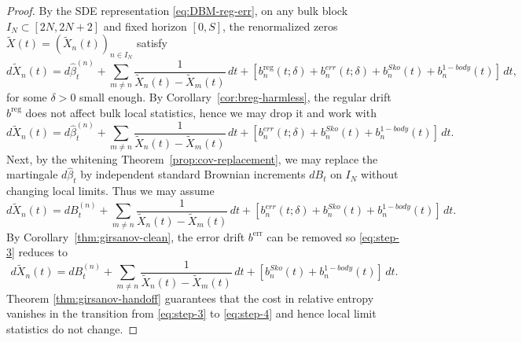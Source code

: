 \documentclass[12pt,reqno]{amsart}
\theoremstyle{plain}
\theoremstyle{definition}
\theoremstyle{remark}
\begin{document}
\begin{proof}
By the SDE representation \eqref{eq:DBM-reg-err}, on any bulk block
$I_N\subset[2N,2N+2]$ and fixed horizon $[0,S]$, the renormalized zeros
$\widetilde X(t)=(\widetilde X_n(t))_{n\in I_N}$ satisfy
\begin{equation}\label{eq:step-1}
d\widetilde X_n(t)
= d\hat\beta^{(n)}_t
+ \sum_{m \neq n}\frac{1}{\widetilde X_n(t)-\widetilde X_m(t)}\,dt
+ \left [b^{\mathrm{reg}}_n(t; \delta)+ b^{err}_n(t; \delta) +b_n^{Sko}(t)+b_n^{1-body}(t) \right ] \, dt,
\end{equation}
for some $\delta>0$ small enough. By Corollary~\ref{cor:breg-harmless}, the regular drift $b^{\mathrm{reg}}$ does not
affect bulk local statistics, hence we may drop it and work with
\begin{equation}\label{eq:step-2}
d\widetilde X_n(t)
= d\hat\beta^{(n)}_t
+ \sum_{m \neq n}\frac{1}{\widetilde X_n(t)-\widetilde X_m(t)}\,dt
+ \left [ b^{err}_n(t; \delta) +b_n^{Sko}(t)+b_n^{1-body}(t) \right ] \, dt.
\end{equation}
Next, by the whitening Theorem~\ref{prop:cov-replacement}, we may replace the martingale $d\hat\beta_t$ by independent standard Brownian increments $dB_t$ on $I_N$
without changing local limits. Thus we may assume
\begin{equation}\label{eq:step-3}
d\widetilde X_n(t)
= d B^{(n)}_t
+ \sum_{m \neq n}\frac{1}{\widetilde X_n(t)-\widetilde X_m(t)}\,dt
+ \left [ b^{err}_n(t; \delta) +b_n^{Sko}(t)+b_n^{1-body}(t) \right ] \, dt.
\end{equation}
By Corollary~\ref{thm:girsanov-clean}, the error drift
$b^{\mathrm{err}}$ can be removed 
so \eqref{eq:step-3} reduces to
\begin{equation}\label{eq:step-4}
d\widetilde X_n(t)
= d B^{(n)}_t
+ \sum_{m \neq n}\frac{1}{\widetilde X_n(t)-\widetilde X_m(t)}\,dt
+ \left [b_n^{Sko}(t)+b_n^{1-body}(t) \right ] \, dt.
\end{equation}
Theorem \ref{thm:girsanov-handoff} guarantees that the cost in relative entropy vanishes in the transition from \eqref{eq:step-3} to \eqref{eq:step-4} and hence local limit statistics do not change. 



\end{proof}
\end{document}

